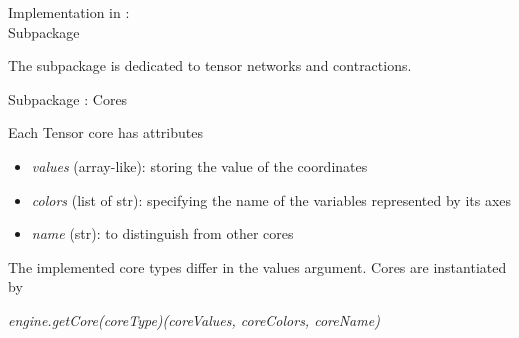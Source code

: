 \documentclass{beamer}
\begin{document}
\begin{frame}{Implementation in \tnreason: \\
Subpackage \spengine}

The subpackage \spengine is dedicated to tensor networks and contractions.

\begin{center}
\end{center}


\end{frame}



\begin{frame}{Subpackage \spengine : Cores}

Each Tensor core has attributes
\begin{itemize}
	\item \emph{values} (array-like): storing the value of the coordinates
	\item \emph{colors} (list of str): specifying the name of the variables represented by its axes
	\item \emph{name} (str): to distinguish from other cores
\end{itemize} 
The implemented core types differ in the values argument.
Cores are instantiated by
\begin{centeredscript}
	\emph{engine.getCore(coreType)(coreValues, coreColors, coreName)}
\end{centeredscript}

\end{frame}
\end{document}

